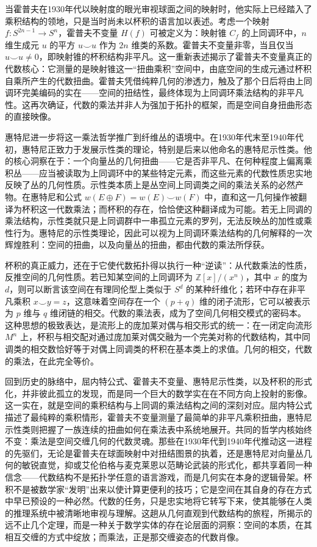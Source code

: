 \documentclass[12pt,a4paper]{article}
\begin{document}
当霍普夫在1930年代以映射度的眼光审视球面之间的映射时，他实际上已经踏入了乘积结构的领地，只是当时尚未以杯积的语言加以表述。考虑一个映射 $f: S^{2n-1} \to S^n$，霍普夫不变量 $H(f)$ 可被定义为：映射锥 $C_f$ 的上同调环中，$n$ 维生成元 $u$ 的平方 $u \smile u$ 作为 $2n$ 维类的系数。霍普夫不变量非零，当且仅当 $u \smile u \neq 0$，即映射锥的杯积结构非平凡。这一重新表述揭示了霍普夫不变量真正的代数核心：它测量的是映射锥这一“扭曲乘积”空间中，由底空间的生成元通过杯积自乘所产生的代数扭曲。霍普夫凭借纯粹几何的渗透力，触及了那个日后将由上同调环完美编码的实在——空间的扭结性，最终体现为上同调环乘法结构的非平凡性。这再次确证，代数的乘法并非人为强加于拓扑的框架，而是空间自身扭曲形态的直接映像。

惠特尼进一步将这一乘法哲学推广到纤维丛的语境中。在1930年代末至1940年代初，惠特尼正致力于发展示性类的理论，特别是后来以他命名的惠特尼示性类。他的核心洞察在于：一个向量丛的几何扭曲——它是否非平凡、在何种程度上偏离乘积丛——应当被读取为上同调环中的某些特定元素，而这些元素的代数性质忠实地反映了丛的几何性质。示性类本质上是丛空间上同调类之间的乘法关系的必然产物。在惠特尼和公式 $w(E \oplus F) = w(E) \smile w(F)$ 中，直和这一几何操作被翻译为杯积这一代数乘法；而杯积的存在，恰恰使这种翻译成为可能。若无上同调的乘法结构，示性类就只是上同调群中一串孤立元素的罗列，无法反映丛的加性或乘性行为。惠特尼的示性类理论，因此可以视为上同调环乘法结构的几何解释的一次辉煌胜利：空间的扭曲，以及向量丛的扭曲，都由代数的乘法所俘获。

杯积的真正威力，还在于它使代数拓扑得以执行一种“逆读”：从代数乘法的性质，反推空间的几何性质。若已知某空间的上同调环为 $\mathbb{Z}[x]/(x^n)$，其中 $x$ 的度为 $d$，则可以断言该空间在有理同伦型上类似于 $S^d$ 的某种纤维化；若环中存在非平凡乘积 $x \smile y = z$，这意味着空间存在一个 $(p+q)$ 维的闭子流形，它可以被表示为 $p$ 维与 $q$ 维闭链的相交。代数的乘法表，成为了空间几何相交模式的密码本。这种思想的极致表达，是流形上的庞加莱对偶与相交形式的统一：在一闭定向流形 $M^n$ 上，杯积与相交配对通过庞加莱对偶交融为一个完美对称的代数结构，其中同调类的相交数恰好等于对偶上同调类的杯积在基本类上的求值。几何的相交，代数的乘法，在此完全等价。

回到历史的脉络中，屈内特公式、霍普夫不变量、惠特尼示性类，以及杯积的形式化，并非彼此孤立的发现，而是同一个巨大的数学实在在不同方向上投射的影像。这一实在，就是空间的乘积结构与上同调的乘法结构之间的深刻对应。屈内特公式描述了最纯粹的乘积情形，霍普夫不变量测量了最简单的非平凡乘积扭曲，惠特尼示性类则把握了一族连续的扭曲如何在乘法表中系统地展开。共同的哲学内核始终不变：乘法是空间交缠几何的代数灵魂。那些在1930年代到1940年代推动这一进程的先驱们，无论是霍普夫在球面映射中对扭结图景的执着，还是惠特尼对向量丛几何的敏锐直觉，抑或艾伦伯格与麦克莱恩以范畴论武装的形式化，都共享着同一种信念——代数结构不是拓扑学任意的语言游戏，而是几何实在本身的逻辑骨架。杯积不是被数学家“发明”出来以使计算更便利的技巧；它是空间在其自身的存在方式中早已预设的一种必然。代数的任务，只是忠实地将它转写下来，使其能够在人类的推理系统中被清晰地审视与理解。这趟从几何直观到代数结构的旅程，所揭示的远不止几个定理，而是一种关于数学实体的存在论层面的洞察：空间的本质，在其相互交缠的方式中绽放；而乘法，正是那交缠姿态的代数肖像。
\end{document}
